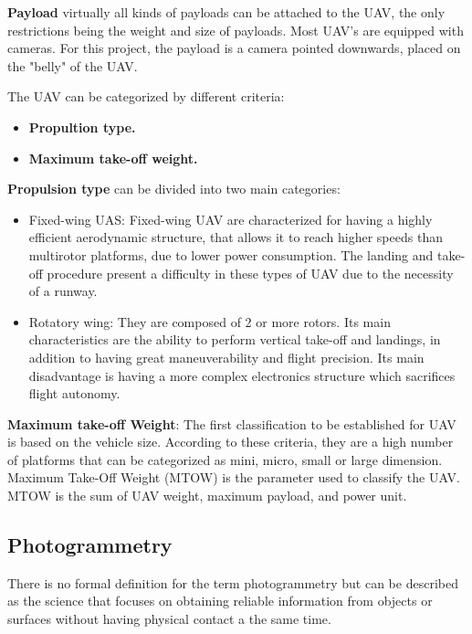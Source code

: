 \textbf{Payload} virtually all kinds of payloads can be attached to the UAV, the only restrictions being the weight and size of payloads. Most UAV's are equipped with cameras. For this project, the payload is a camera pointed downwards, placed on the "belly" of the UAV. 

The UAV can be categorized by different criteria: 
\begin{itemize}
    \item \textbf{Propultion type.}
    \item  \textbf{Maximum take-off weight.}
\end{itemize}
\textbf{Propulsion type} can be divided into two main categories:
\begin{itemize}
\item Fixed-wing UAS: Fixed-wing UAV are characterized for having a highly efficient aerodynamic structure, that allows it to reach higher speeds than multirotor platforms, due to lower power consumption. The landing and take-off procedure present a difficulty in these types of UAV due to the necessity of a runway.
\item Rotatory wing: They are composed of 2 or more rotors. Its main characteristics are the ability to perform vertical take-off and landings, in addition to having great maneuverability and flight precision. Its main disadvantage is having a more complex electronics structure which sacrifices flight autonomy.\cite{Luis_Fernadno}
\end{itemize}

\textbf{Maximum take-off Weight}: The first classification to be established for UAV is based on the vehicle size. According to these criteria, they are a high number of platforms that can be categorized as mini, micro, small or large dimension. Maximum Take-Off Weight (MTOW) is the parameter used to classify the UAV. MTOW is the sum of UAV weight, maximum payload, and power unit.\cite{ICAO}

\subsection{Photogrammetry}
There is no formal definition for the term photogrammetry but  can be described as the science that focuses on obtaining  reliable information from objects or surfaces without having physical contact a the same time.\cite{Fotogrametria_digital}

